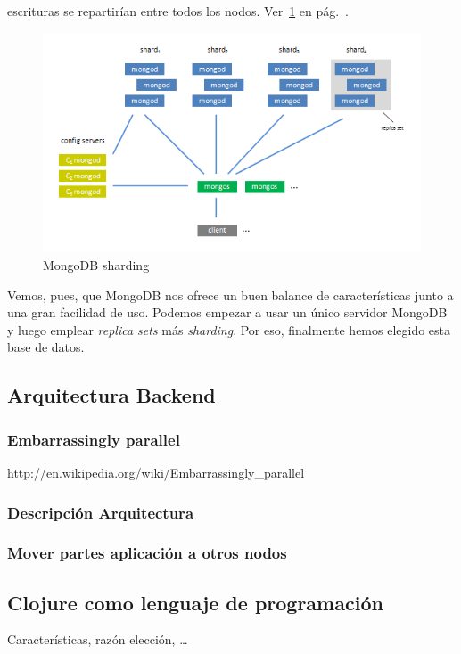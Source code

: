 \begin{description}
  escrituras se repartirían entre todos los nodos. Ver~\ref{sharding}
  en pág.~\pageref{sharding}.
  \begin{figure}[hbtp]
    \includegraphics[width=1\textwidth]{chapters/technical-manual/sharding.png}
    \caption{MongoDB sharding}\label{sharding}
  \end{figure}
\end{description}

Vemos, pues, que MongoDB nos ofrece un buen balance de características
junto a una gran facilidad de uso. Podemos empezar a usar un único
servidor MongoDB y luego emplear \emph{replica sets} más
\emph{sharding}. Por eso, finalmente hemos elegido esta base de datos.

\subsection{Arquitectura Backend}
\subsubsection{Embarrassingly parallel}
http://en.wikipedia.org/wiki/Embarrassingly\_parallel
\subsubsection{Descripción Arquitectura}
\subsubsection{Mover partes aplicación a otros nodos}

\subsection{Clojure como lenguaje de programación}
Características, razón elección, \ldots{}
